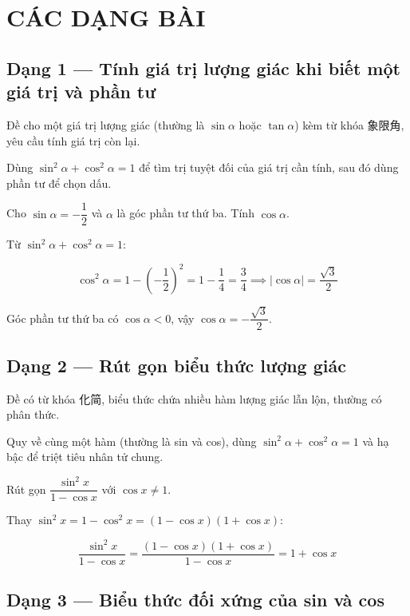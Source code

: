 \documentclass[11pt, a4paper]{article}
\begin{document}
\section{CÁC DẠNG BÀI}

\subsection{Dạng 1 — Tính giá trị lượng giác khi biết một giá trị và phần tư}

 Đề cho một giá trị lượng giác (thường là $\sin\alpha$ hoặc $\tan\alpha$) kèm từ khóa 象限角, yêu cầu tính giá trị còn lại.

 Dùng $\sin^2\alpha + \cos^2\alpha = 1$ để tìm trị tuyệt đối của giá trị cần tính, sau đó dùng phần tư để chọn dấu.

\begin{vidu}[{1}]
Cho $\sin\alpha = -\dfrac{1}{2}$ và $\alpha$ là góc phần tư thứ ba. Tính $\cos\alpha$.

Từ $\sin^2\alpha + \cos^2\alpha = 1$:

$$\cos^2\alpha = 1 - \left(-\frac{1}{2}\right)^2 = 1 - \frac{1}{4} = \frac{3}{4} \implies |\cos\alpha| = \frac{\sqrt{3}}{2}$$

Góc phần tư thứ ba có $\cos\alpha < 0$, vậy $\cos\alpha = -\dfrac{\sqrt{3}}{2}$.

\end{vidu}
\subsection{Dạng 2 — Rút gọn biểu thức lượng giác}

 Đề có từ khóa 化简, biểu thức chứa nhiều hàm lượng giác lẫn lộn, thường có phân thức.

 Quy về cùng một hàm (thường là sin và cos), dùng $\sin^2\alpha + \cos^2\alpha = 1$ và hạ bậc để triệt tiêu nhân tử chung.

\begin{vidu}[{2}]
Rút gọn $\dfrac{\sin^2 x}{1 - \cos x}$ với $\cos x \neq 1$.

Thay $\sin^2 x = 1 - \cos^2 x = (1-\cos x)(1+\cos x)$:

$$\frac{\sin^2 x}{1 - \cos x} = \frac{(1-\cos x)(1+\cos x)}{1 - \cos x} = 1 + \cos x$$

\end{vidu}
\subsection{Dạng 3 — Biểu thức đối xứng của sin và cos}
\end{document}
